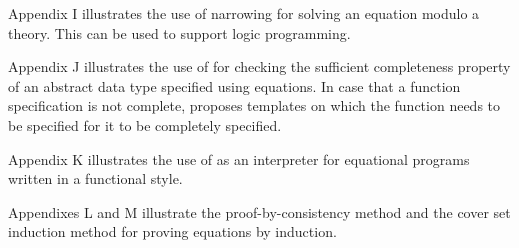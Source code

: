 Appendix I illustrates the use of narrowing for solving an equation
modulo a theory. This can be used to support logic programming.

Appendix J illustrates the use of \RRL for checking the sufficient
completeness property of an abstract data type specified using
equations. In case that a function specification is not complete, \RRL
proposes templates on which the function needs to be specified for it
to be completely specified.

Appendix K illustrates the use of \RRL as an interpreter for
equational programs written in a functional style.

Appendixes L and M illustrate the proof-by-consistency method
and the cover set induction method for proving
equations by induction.

